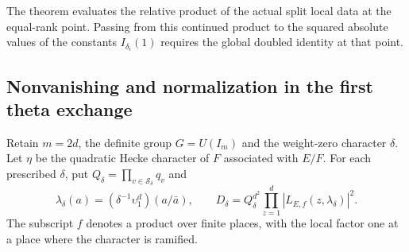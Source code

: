 \documentclass[a4paper,11pt]{article}
\theoremstyle{definition}
\theoremstyle{remark}
\numberwithin{equation}{section}
\begin{document}
The theorem evaluates the relative product of the actual
split local data at the equal-rank point. Passing from this
continued product to the squared absolute values of the
constants \(I_{\delta_i}(1)\) requires the global doubled
identity at that point.
\clearpage

\subsection{Nonvanishing and normalization in the first theta exchange}
\label{sec:globalfirst828}
Retain \(m=2d\), the definite group \(G=U(I_m)\) and the
weight-zero character \(\delta\). Let \(\eta\) be the quadratic
Hecke character of \(F\) associated with \(E/F\). For each
prescribed \(\delta\), put \(Q_\delta=\prod_{v\in\mathcal S_\delta}q_v\)
and
\[
 \lambda_\delta(a)=(\delta^{-1}\upsilon_1^d)(a/\bar a),\qquad
 D_\delta=Q_\delta^{d^2}\prod_{z=1}^d|L_{E,f}(z,\lambda_\delta)|^2 .
\]
The subscript \(f\) denotes a product over finite places, with
the local factor one at a place where the character is ramified.
\end{document}
